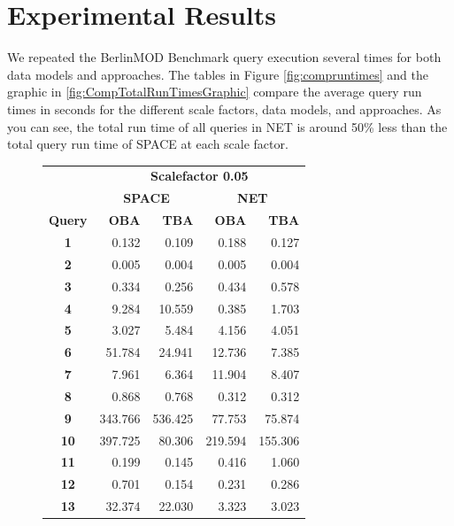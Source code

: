 \documentclass[a4paper]{article}
\newcommand{\bmodb} {BerlinMOD Benchmark}
\begin{document}
\section{Experimental Results}
\label{sec:results}
We repeated the \bmodb{} query execution several times for both data models and
approaches. The tables in Figure \ref{fig:compruntimes} and the graphic in
\ref{fig:CompTotalRunTimesGraphic} compare the average query run times in seconds
for the different scale factors, data models, and approaches.
As you can see, the total run time of all queries in NET is around
50\% less than the total query run time of SPACE at each scale factor.
\begin{figure}[h]
  \begin{minipage}{0.5\linewidth}
    \begin{tiny}
      \begin{tabular}{|c|r|r|r|r|}
        \hline
        &\multicolumn{4}{c|}{\textbf{Scalefactor 0.05}}\\
        \cline{2-5}
        &\multicolumn{2}{c|}{\textbf{SPACE}}&\multicolumn{2}{c|}{\textbf{NET}}\\
        \hline
        \textbf{Query}&\textbf{OBA}&\textbf{TBA}&\textbf{OBA}&\textbf{TBA}\\
        \hline
        \textbf{1}&0.132&0.109&0.188&0.127\\
        \hline
        \textbf{2}&0.005&0.004&0.005&0.004\\
        \hline
        \textbf{3}&0.334&0.256&0.434&0.578\\
        \hline
        \textbf{4}&9.284&10.559&0.385&1.703\\
        \hline
        \textbf{5}&3.027&5.484&4.156&4.051\\
        \hline
        \textbf{6}&51.784&24.941&12.736&7.385\\
        \hline
        \textbf{7}&7.961&6.364&11.904&8.407\\
        \hline
        \textbf{8}&0.868&0.768&0.312&0.312\\
        \hline
        \textbf{9}&343.766&536.425&77.753&75.874\\
        \hline
        \textbf{10}&397.725&80.306&219.594&155.306\\
        \hline
        \textbf{11}&0.199&0.145&0.416&1.060\\
        \hline
        \textbf{12}&0.701&0.154&0.231&0.286\\
        \hline
        \textbf{13}&32.374&22.030&3.323&3.023\\

\end{tabular}
\end{tiny}
\end{minipage}
\end{figure}
\end{document}
